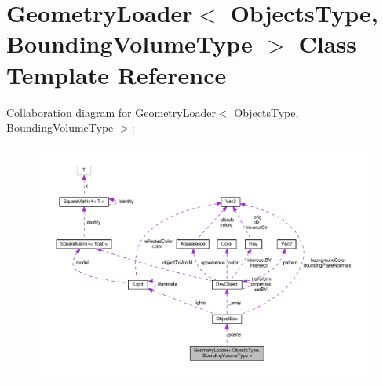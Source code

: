 \hypertarget{class_geometry_loader}{}\section{Geometry\+Loader$<$ Objects\+Type, Bounding\+Volume\+Type $>$ Class Template Reference}
\label{class_geometry_loader}


Collaboration diagram for Geometry\+Loader$<$ Objects\+Type, Bounding\+Volume\+Type $>$\+:
\nopagebreak
\begin{figure}[H]
\begin{center}
\leavevmode
\includegraphics[width=350pt]{class_geometry_loader__coll__graph}
\end{center}
\end{figure}
